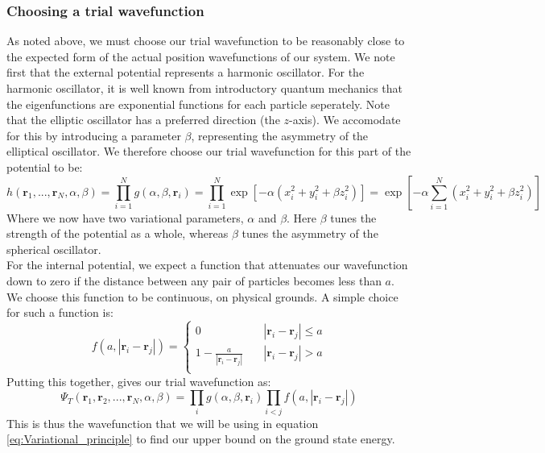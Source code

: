 \documentclass[a4paper, 10pt]{article}
\begin{document}
	\subsubsection{Choosing a trial wavefunction}
	As noted above, we must choose our trial wavefunction to be reasonably close to the expected form of the actual position wavefunctions of our system. We note first that the external potential represents a harmonic oscillator. For the harmonic oscillator, it is well known from introductory quantum mechanics that the eigenfunctions are exponential functions for each particle seperately. Note that the elliptic oscillator has a preferred direction (the $z$-axis). We accomodate for this by introducing a parameter $\beta$, representing the asymmetry of the elliptical oscillator. We therefore choose our trial wavefunction for this part of the potential to be:
	\begin{equation}
	h(\boldsymbol{r}_1, ..., \boldsymbol{r}_N, \alpha, \beta)=\prod_{i=1}^N g(\alpha,\beta, \boldsymbol{r}_i)=\prod_{i=1}^N \exp[-\alpha(x_i^2+y_i^2+\beta z_i^2)]=\exp[-\alpha \sum_{i=1}^N (x_i^2+y_i^2+\beta z_i^2)]
	\end{equation}
	Where we now have two variational parameters, $\alpha$ and $\beta$. Here $\beta$ tunes the strength of the potential as a whole, whereas $\beta$ tunes the asymmetry of the spherical oscillator.\\
	\linebreak
	For the internal potential, we expect a function that attenuates our wavefunction down to zero if the distance between any pair of particles becomes less than $a$. We choose this function to be continuous, on physical grounds. A simple choice for such a function is:
	\begin{equation}
	f(a,|\boldsymbol{r}_i-\boldsymbol{r}_j|)= 
	\begin{cases}
	0 & \quad |\boldsymbol{r}_i-\boldsymbol{r}_j| \leq  a\\
	1-\frac{a}{|\boldsymbol{r}_i-\boldsymbol{r}_j|} & \quad |\boldsymbol{r}_i-\boldsymbol{r}_j|>  a\\
	\end{cases}
	\end{equation}
	Putting this together, gives our trial wavefunction as:
	\begin{equation}\label{eq:trial_wavefunction}
	\Psi_T(\boldsymbol{r}_1, \boldsymbol{r}_2, ..., \boldsymbol{r}_N, \alpha, \beta)=\prod_ig(\alpha,\beta, \boldsymbol{r}_i)\prod_{i<j}f(a, |\boldsymbol{r}_i-\boldsymbol{r}_j|)
	\end{equation}
	This is thus the wavefunction that we will be using in equation \ref{eq:Variational_principle} to find our upper bound on the ground state energy.
\end{document}
